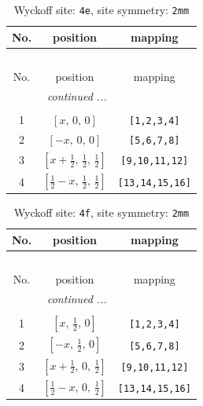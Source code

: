 \documentclass[fleqn,8pt]{jsarticle}
\begin{document}
\begin{longtable}{ccc}
\caption{Wyckoff site: {\tt 4e}, site symmetry: {\tt 2mm}}
 \\
 \hline \hline
No. & position & mapping \\ \hline \endfirsthead

\multicolumn{2}{l}{\tablename\ \thetable{}} \\
 \hline \hline
No. & position & mapping \\ \hline \endhead

 \hline \hline
\multicolumn{2}{r}{\footnotesize\it continued ...} \\ \endfoot

 \hline \hline
\multicolumn{2}{r}{} \\ \endlastfoot

1 & $\left[ x,\, 0,\, 0 \right]$ & {\tt [1,2,3,4]} \\ \hline
2 & $\left[ - x,\, 0,\, 0 \right]$ & {\tt [5,6,7,8]} \\ \hline
3 & $\left[ x + \frac{1}{2},\, \frac{1}{2},\, \frac{1}{2} \right]$ & {\tt [9,10,11,12]} \\ \hline
4 & $\left[ \frac{1}{2} - x,\, \frac{1}{2},\, \frac{1}{2} \right]$ & {\tt [13,14,15,16]} \\
\end{longtable}
\renewcommand{\arraystretch}{1.2}
\begin{longtable}{ccc}
\caption{Wyckoff site: {\tt 4f}, site symmetry: {\tt 2mm}}
 \\
 \hline \hline
No. & position & mapping \\ \hline \endfirsthead

\multicolumn{2}{l}{\tablename\ \thetable{}} \\
 \hline \hline
No. & position & mapping \\ \hline \endhead

 \hline \hline
\multicolumn{2}{r}{\footnotesize\it continued ...} \\ \endfoot

 \hline \hline
\multicolumn{2}{r}{} \\ \endlastfoot

1 & $\left[ x,\, \frac{1}{2},\, 0 \right]$ & {\tt [1,2,3,4]} \\ \hline
2 & $\left[ - x,\, \frac{1}{2},\, 0 \right]$ & {\tt [5,6,7,8]} \\ \hline
3 & $\left[ x + \frac{1}{2},\, 0,\, \frac{1}{2} \right]$ & {\tt [9,10,11,12]} \\ \hline
4 & $\left[ \frac{1}{2} - x,\, 0,\, \frac{1}{2} \right]$ & {\tt [13,14,15,16]} \\
\end{longtable}
\end{document}
